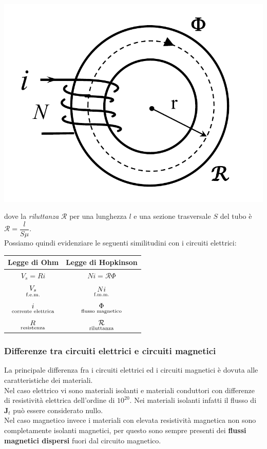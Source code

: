 \documentclass{article}
\begin{document}
\begin{center}
    \includegraphics[scale=0.27]{Image/Legge_di_Hopkinson.png}
\end{center}
dove la \textit{riluttanza} $\mathcal{R}$ per una lunghezza $l$ e una sezione trasversale $S$ del tubo è $\mathcal{R}= \dfrac{l}{S \mu}$.
\vspace*{0.2cm}\\
Possiamo quindi evidenziare le seguenti similitudini con i circuiti elettrici:
\begin{center}
    \begin{tabular}{|c|c|}
        \hline 
        \textbf{Legge di Ohm} & \textbf{Legge di Hopkinson}\\
        \hline 
        $V_s=Ri$ & $Ni = \mathcal{R}\Phi$\\
        \hline 
        $\underset{\text{f.e.m.}}{V_s}$  & $\underset{\text{f.m.m.}}{Ni}$\\
        \hline
        $\underset{\text{corrente elettrica}}{i}$ & $\underset{\text{flusso magnetico}}{\Phi}$ \\
        \hline
        $\underset{\text{resistenza}}{R}$ & $\underset{\text{riluttanza}}{\mathcal{R}}$ \\
        \hline
    \end{tabular}
\end{center}


\subsubsection{Differenze tra circuiti elettrici e circuiti magnetici}
La principale differenza fra i circuiti elettrici ed i circuiti magnetici è dovuta alle caratteristiche dei materiali.\\
Nel caso elettrico vi sono materiali isolanti e materiali conduttori con differenze di resistività elettrica dell'ordine di $10^{20}$. Nei materiali isolanti infatti il flusso di $\mathbf{J}_t$ può essere considerato nullo.\\
Nel caso magnetico invece i materiali con elevata resistività magnetica non sono completamente isolanti magnetici, per questo sono sempre presenti dei \textbf{flussi magnetici dispersi} fuori dal circuito magnetico.
\end{document}
